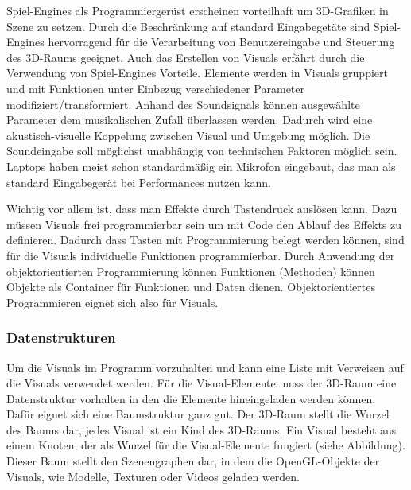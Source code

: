 Spiel-Engines als Programmierger\"ust erscheinen vorteilhaft um 3D-Grafiken in Szene zu setzen. Durch die Beschr\"ankung
auf standard Eingabeget\"ate sind Spiel-Engines hervorragend f\"ur die Verarbeitung von Benutzereingabe und Steuerung
des 3D-Raums geeignet. Auch das Erstellen von Visuals erf\"ahrt durch die Verwendung von Spiel-Engines Vorteile. Elemente
werden in Visuals gruppiert und mit Funktionen unter Einbezug verschiedener Parameter modifiziert/transformiert. Anhand
des Soundsignals k\"onnen ausgew\"ahlte Parameter dem musikalischen Zufall \"uberlassen werden. Dadurch wird eine
akustisch-visuelle Koppelung zwischen Visual und Umgebung m\"oglich. Die Soundeingabe soll m\"oglichst unabh\"angig von
technischen Faktoren m\"oglich sein. Laptops haben meist schon standardm\"a\ss{}ig ein Mikrofon eingebaut, das man als
standard Eingabeger\"at bei Performances nutzen kann.

Wichtig vor allem ist, dass man Effekte durch Tastendruck ausl\"osen kann. Dazu m\"ussen Visuals frei programmierbar sein
um mit Code den Ablauf des Effekts zu definieren. Dadurch dass Tasten mit Programmierung belegt werden k\"onnen, sind f\"ur
die Visuals individuelle Funktionen programmierbar. Durch Anwendung der objektorientierten Programmierung k\"onnen
Funktionen (Methoden) k\"onnen Objekte als Container f\"ur Funktionen und Daten dienen. Objektorientiertes Programmieren
eignet sich also f\"ur Visuals.



\subsubsection{Datenstrukturen}

Um die Visuals im Programm vorzuhalten und kann eine Liste mit Verweisen auf die Visuals verwendet werden. F\"ur
die Visual-Elemente muss der 3D-Raum eine Datenstruktur vorhalten in den die Elemente hineingeladen werden k\"onnen.
Daf\"ur eignet sich eine Baumstruktur ganz gut. Der 3D-Raum stellt die Wurzel des Baums dar, jedes Visual ist ein
Kind des 3D-Raums. Ein Visual besteht aus einem Knoten, der als Wurzel f\"ur die Visual-Elemente fungiert
(siehe Abbildung). Dieser Baum stellt den Szenengraphen dar, in dem die OpenGL-Objekte der Visuals, wie Modelle, Texturen
oder Videos geladen werden.

